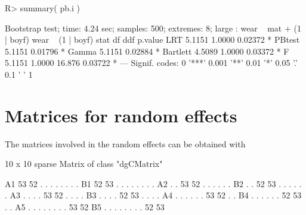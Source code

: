 \documentclass[11pt]{article}
\begin{document}
\begin{Schunk}
\begin{Sinput}
R> summary( pb.i )
\end{Sinput}
\begin{Soutput}
Bootstrap test; time: 4.24 sec; samples: 500; extremes: 8;
large : wear ~ mat + (1 | boyf)
wear ~ (1 | boyf)
           stat     df    ddf p.value  
LRT      5.1151 1.0000        0.02372 *
PBtest   5.1151               0.01796 *
Gamma    5.1151               0.02884 *
Bartlett 4.5089 1.0000        0.03372 *
F        5.1151 1.0000 16.876 0.03722 *
---
Signif. codes:  0 '***' 0.001 '**' 0.01 '*' 0.05 '.' 0.1 ' ' 1
\end{Soutput}
\end{Schunk}


\appendix

\section{Matrices for random effects}
\label{sec:matr-rand-effects}

The matrices involved in the random effects can be obtained with

\begin{Schunk}
\end{Schunk}

\begin{Schunk}
\begin{Soutput}
10 x 10 sparse Matrix of class "dgCMatrix"
                                
A1 53 52  .  .  .  .  .  .  .  .
B1 52 53  .  .  .  .  .  .  .  .
A2  .  . 53 52  .  .  .  .  .  .
B2  .  . 52 53  .  .  .  .  .  .
A3  .  .  .  . 53 52  .  .  .  .
B3  .  .  .  . 52 53  .  .  .  .
A4  .  .  .  .  .  . 53 52  .  .
B4  .  .  .  .  .  . 52 53  .  .
A5  .  .  .  .  .  .  .  . 53 52
B5  .  .  .  .  .  .  .  . 52 53
\end{Soutput}
\end{Schunk}
\end{document}
